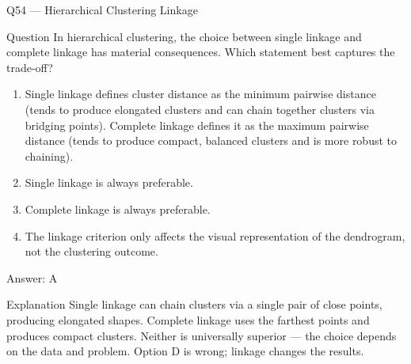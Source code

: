 \documentclass[aspectratio=169,8pt]{beamer}
\begin{document}
	\begin{frame}{Q54 --- Hierarchical Clustering Linkage}
		\begin{block}{Question}
			In hierarchical clustering, the choice between single linkage and complete linkage has material consequences. Which statement best captures the trade-off?
		\end{block}
		\begin{enumerate}
			\item Single linkage defines cluster distance as the minimum pairwise distance (tends to produce elongated clusters and can chain together clusters via bridging points). Complete linkage defines it as the maximum pairwise distance (tends to produce compact, balanced clusters and is more robust to chaining).
			\item Single linkage is always preferable.
			\item Complete linkage is always preferable.
			\item The linkage criterion only affects the visual representation of the dendrogram, not the clustering outcome.
		\end{enumerate}
		\begin{exampleblock}{Answer: A}\end{exampleblock}
		\begin{block}{Explanation}
			Single linkage can chain clusters via a single pair of close points, producing elongated shapes. Complete linkage uses the farthest points and produces compact clusters. Neither is universally superior --- the choice depends on the data and problem. Option D is wrong; linkage changes the results.
		\end{block}
	\end{frame}
	
\end{document}
